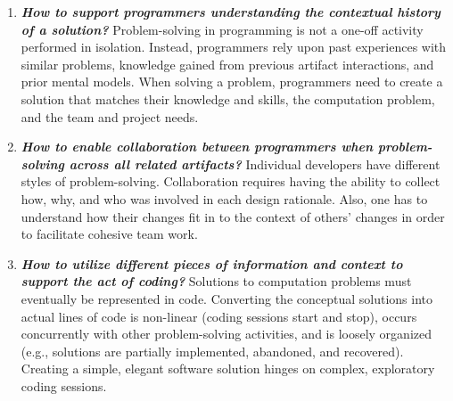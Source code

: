 \begin{enumerate}[label=C\arabic*.]
  \item \textit{\textbf{How to support programmers understanding the contextual history of a solution?}}
  Problem-solving in programming is not a one-off activity performed in isolation.
  Instead, programmers rely upon past experiences with similar problems, knowledge gained from previous artifact interactions, and prior mental models.%
  When solving a problem, programmers need to create a solution that matches their knowledge and skills, the computation problem, and the team and project needs.
  
  \item \textit{\textbf{How to enable collaboration between programmers when problem-solving across all related artifacts?}}
  Individual developers have different styles of problem-solving.
  Collaboration requires having the ability to collect how, why, and who was involved in each design rationale.
  Also, one has to understand how their changes fit in to the context of others' changes in order to facilitate cohesive team work.
  
  \item \textit{\textbf{How to utilize different pieces of information and context to support the act of coding?}}
  Solutions to computation problems must eventually be represented in code.
  Converting the conceptual solutions into actual lines of code is non-linear (coding sessions start and stop), occurs concurrently with other problem-solving activities, and is loosely organized (e.g., solutions are partially implemented, abandoned, and recovered).
Creating a simple, elegant software solution hinges on complex, exploratory coding sessions.

\end{enumerate}